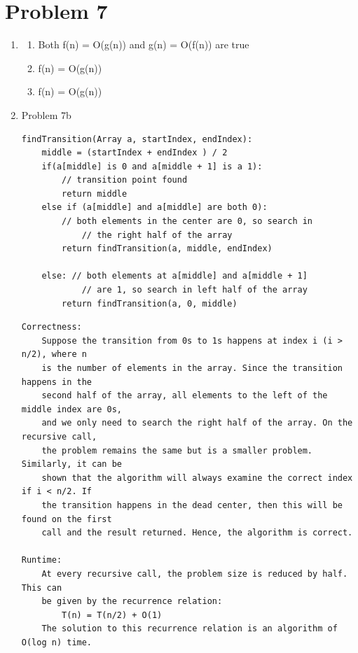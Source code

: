 \documentclass[11pt]{article}
\newcommand{\solution}[1]{{{\color{blue}{\bf Solution:} {#1}}}}
\begin{document}
\section{Problem 7}
\begin{enumerate}
\item
\begin{enumerate}
\item 
\solution{}
Both f(n) = O(g(n)) and g(n) = O(f(n)) are true

\item
\solution{}
f(n) = O(g(n))

\item 
\solution{}
f(n) = O(g(n))
\end{enumerate}


\item Problem 7b \newline
\solution{}
\begin{lstlisting}
findTransition(Array a, startIndex, endIndex):
	middle = (startIndex + endIndex ) / 2
	if(a[middle] is 0 and a[middle + 1] is a 1):
		// transition point found
		return middle
	else if (a[middle] and a[middle] are both 0):
		// both elements in the center are 0, so search in 
			// the right half of the array
		return findTransition(a, middle, endIndex)
		
	else: // both elements at a[middle] and a[middle + 1] 
			// are 1, so search in left half of the array
		return findTransition(a, 0, middle)
\end{lstlisting}
\begin{verbatim}		
Correctness:
	Suppose the transition from 0s to 1s happens at index i (i > n/2), where n 
	is the number of elements in the array. Since the transition happens in the 
	second half of the array, all elements to the left of the middle index are 0s, 
	and we only need to search the right half of the array. On the recursive call, 
	the problem remains the same but is a smaller problem. Similarly, it can be 
	shown that the algorithm will always examine the correct index if i < n/2. If 
	the transition happens in the dead center, then this will be found on the first
	call and the result returned. Hence, the algorithm is correct.

Runtime:
	At every recursive call, the problem size is reduced by half. This can 
	be given by the recurrence relation:
		T(n) = T(n/2) + O(1)
	The solution to this recurrence relation is an algorithm of O(log n) time. 
\end{verbatim}



\end{enumerate}
\end{document}
